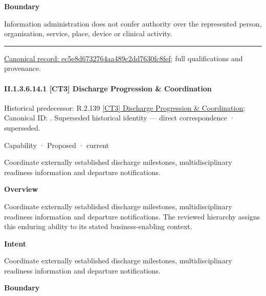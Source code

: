 \textbf{Boundary}



Information administration does not confer authority over the represented person, organisation, service, place, device or clinical activity.



\medskip\hrule\medskip

{\footnotesize \href{../../../../continuum/strategy/capability/ec5e8d6732764aa489c2dd7630fc8fef.md}{Canonical record: ec5e8d6732764aa489c2dd7630fc8fef}; full qualifications and provenance.}\par
\paragraph*{II.1.3.6.14.1 [CT3] Discharge Progression \& Coordination}
\label{navigation:II.1.3.6.14.1}

{\small Historical predecessor: R.2.139 \hyperref[element:68344272ca6049648a3ddae20c150f37]{[CT3] Discharge Progression \& Coordination}; Canonical ID: \texttt{}. Superseded historical identity — direct correspondence · superseded.}\par
\label{element:d6048993146b45639bab27860f94f34f}
{\small Capability · Proposed · current}\par

Coordinate externally established discharge milestones, multidisciplinary readiness information and departure notifications.



\textbf{Overview}



Coordinate externally established discharge milestones, multidisciplinary readiness information and departure notifications. The reviewed hierarchy assigns this enduring ability to its stated business-enabling context.



\textbf{Intent}



Coordinate externally established discharge milestones, multidisciplinary readiness information and departure notifications.



\textbf{Boundary}



